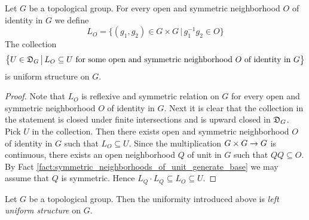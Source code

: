 \documentclass[10pt]{amsart}
\begin{document}
\begin{fact}\label{fact:left_uniform_structure_on_topological_group}
	Let $G$ be a topological group. For every open and symmetric neighborhood $O$ of identity in $G$ we define
	$$L_O = \big\{(g_1,g_2)\in G\times G\,\big|\,g_1^{-1}g_2 \in O\big\}$$
	The collection
	$$\big\{U \in {\mathfrak D}_G\,\big|\,L_O\subseteq U\mbox{ for some open and symmetric neighborhood }O\mbox{ of identity in }G\big\}$$
	is uniform structure on $G$.
\end{fact}
\begin{proof}
	Note that $L_O$ is reflexive and symmetric relation on $G$ for every open and symmetric neighborhood $O$ of identity in $G$. Next it is clear that the collection in the statement is closed under finite intersections and is upward closed in ${\mathfrak D}_G$. Pick $U$ in the collection. Then there exists open and symmetric neighborhood $O$ of identity in $G$ such that $L_O\subseteq U$. Since the multiplication $G\times G\rightarrow G$ is continuous, there exists an open neighborhood $Q$ of unit in $G$ such that $QQ \subseteq O$. By Fact \ref{fact:symmetric_neighborhoods_of_unit_generate_base} we may assume that $Q$ is symmetric. Hence $L_Q\cdot L_Q \subseteq L_O\subseteq U$.
\end{proof}

\begin{definition}
	Let $G$ be a topological group. Then the uniformity introduced above is \textit{left uniform structure} on $G$.
\end{definition}
\end{document}
